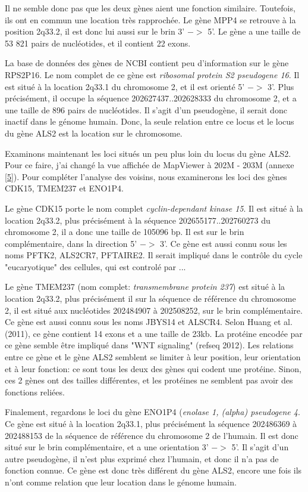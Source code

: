 \documentclass[11pt]{article} %
\begin{document}
Il ne semble donc pas que les deux gènes aient une fonction similaire. Toutefois, ils ont en commun une location très 
rapprochée. Le gène MPP4 se retrouve à la position 2q33.2, il est donc lui aussi sur le brin 3' $->$ 5'. Le gène a une 
taille de 53 821 pairs de nucléotides, et il contient 22 exons. 

La base de données des gènes de NCBI contient peu d'information sur le gène RPS2P16. Le nom complet de ce gène est
\emph{ribosomal protein S2 pseudogene 16}. Il est situé à la location 2q33.1 du chromosome 2, et il est orienté
5' $->$ 3'. Plus précisément, il occupe la séquence 202627437..202628333 du chromosome 2, et a une taille de 896 pairs de 
nucléotides. Il s'agit d'un pseudogène, il serait donc inactif dans le génome humain. Donc, la seule relation entre ce locus
et le locus du gène ALS2 est la location sur le chromosome.

Examinons maintenant les loci situés un peu plus loin du locus du gène ALS2. Pour ce faire, j'ai changé la vue affichée de
MapViewer à 202M - 203M (annexe \ref{5}). Pour compléter l'analyse des voisins, nous examinerons les loci des gènes CDK15,
TMEM237 et ENO1P4.

Le gène CDK15 porte le nom complet \emph{cyclin-dependant kinase 15}. Il est situé à la location 2q33.2, plus précisément
à la séquence 202655177..202760273 du chromosome 2, il a donc une taille de 105096 bp. Il est sur le brin complémentaire, dans la direction 5' $->$ 3'. 
Ce gène est aussi connu sous les noms PFTK2, ALS2CR7, PFTAIRE2. Il serait impliqué dans le contrôle du cycle "eucaryotique" des cellules, qui est controlé par ...

Le gène TMEM237 (nom complet: \emph{transmembrane protein 237}) est situé à la location 2q33.2, plus précisément il sur la séquence de
référence du chromosome 2, il est situé aux nucléotides 202484907 à 202508252, sur le brin complémentaire. Ce gène est aussi 
connu sous les noms JBYS14 et ALSCR4. Selon Huang et al. (2011), ce gène contient 14 exons et a une taille de 23kb. La protéine
encodée par ce gène semble être impliqué dans "WNT signaling" (refseq 2012). Les relations entre ce gène et le gène ALS2 semblent
se limiter à leur position, leur orientation et à leur fonction: ce sont tous les deux des gènes qui codent une protéine. Sinon, ces 2
gènes ont des tailles différentes, et les protéines ne semblent pas avoir des fonctions reliées.

Finalement, regardons le loci du gène ENO1P4 (\emph{enolase 1, (alpha) pseudogene 4}. Ce gène est situé  à la location
2q33.1, plus précisément la séquence 202486369 à 202488153 de la séquence de référence du chromosome 2 de l'humain. Il est
donc situé sur le brin complémentaire, et a une orientation 3' $->$ 5'. Il s'agit d'un autre pseudogène, il n'est plus
exprimé chez l'humain, et donc il n'a pas de fonction connue. Ce gène est donc très différent du gène ALS2, encore une fois
ils n'ont comme relation que leur location dans le génome humain.
\end{document}
